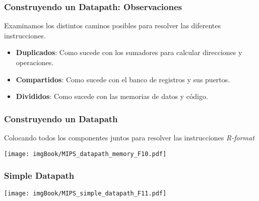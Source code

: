 \documentclass[aspectratio=169]{beamer}
\begin{document}
\begin{frame}[t,fragile]
    \frametitle{Construyendo un Datapath: Observaciones}
    Examinamos los distintos caminos posibles para resolver las diferentes instrucciones.\\
    \bigskip
    \bigskip
    \begin{itemize}
     \item<5-> \textbf{Duplicados}: Como sucede con los sumadores para calcular direcciones y operaciones.
     \item<6-> \textbf{Compartidos}: Como sucede con el banco de registros y sus puertos.
     \item<7-> \textbf{Divididos}: Como sucede con las memorias de datos y código.
    \end{itemize}
    \begin{center}
    \end{center}
\end{frame}

\begin{frame}[t,fragile]
    \frametitle{Construyendo un Datapath}
    Colocando todos los componentes juntos para resolver las instrucciones \emph{R-format}
    \begin{center}
    \texttt{[image: imgBook/MIPS\_datapath\_memory\_F10.pdf]}
    \end{center}
\end{frame}

\begin{frame}[t,fragile]
    \frametitle{Simple Datapath}
    \begin{center}
    \texttt{[image: imgBook/MIPS\_simple\_datapath\_F11.pdf]}
    \end{center}
\end{frame}
\end{document}
